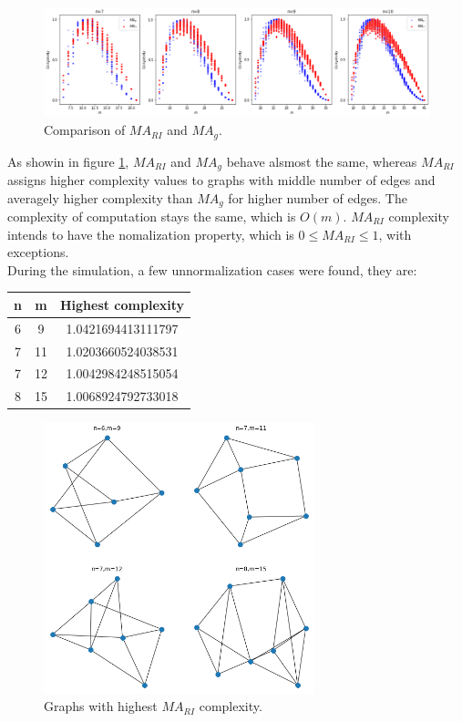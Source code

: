 \documentclass[12pt]{article}
\begin{document}
\begin{figure}[ht]
    \centering
    \includegraphics[width=\textwidth]{mag&mari.png}
    \caption{Comparison of $MA_{RI}$ and $MA_{g}$.}
    \label{fig:mari&mag}
\end{figure}
\noindent
As showin in figure \ref{fig:mari&mag}, $MA_{RI}$ and $MA_{g}$ behave alsmost the same, whereas $MA_{RI}$ assigns higher complexity values to graphs with middle number of edges and averagely higher complexity than $MA_{g}$ for higher number of edges. The complexity of computation stays the same, which is $O(m)$. $MA_{RI}$ complexity intends to have the nomalization property, which is $0\leq MA_{RI}\leq 1$, with exceptions.\\
During the simulation, a few unnormalization cases were found, they are:\\
\begin{table}[h]
    \centering
    \begin{tabular}{|c|c|c|}
        \hline
        n & m & Highest complexity\\
        \hline
        6 & 9 & 1.0421694413111797\\
        \hline
        7 & 11 & 1.0203660524038531\\
        \hline
        7 & 12 & 1.0042984248515054\\
        \hline
        8 & 15 & 1.0068924792733018\\
        \hline
    \end{tabular}
\end{table}
\begin{figure}[ht]
    \centering
    \includegraphics[width=0.7\textwidth]{mari_exception.png}
    \caption{Graphs with highest $MA_{RI}$ complexity.}
    \label{fig:mari_execption}
\end{figure}
\end{document}
